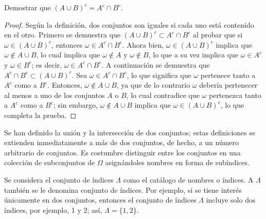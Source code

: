 \documentclass[
  letterpaper,
  DIV=11,
  numbers=noendperiod]{scrreport}
\theoremstyle{plain}
\theoremstyle{definition}
\theoremstyle{definition}
\theoremstyle{plain}
\theoremstyle{remark}
\begin{document}
\begin{tcolorbox}[enhanced jigsaw, titlerule=0mm, left=2mm, opacityback=0, toprule=.15mm, colframe=quarto-callout-caution-color-frame, bottomrule=.15mm, breakable, coltitle=black, opacitybacktitle=0.6, bottomtitle=1mm, colback=white, arc=.35mm, leftrule=.75mm, toptitle=1mm, colbacktitle=quarto-callout-caution-color!10!white, title={Ejemplo}, rightrule=.15mm]

Demostrar que \((A \cup B)^c = A^c \cap B^c\).

\begin{proof}
Según la definición, dos conjuntos son iguales si cada uno está
contenido en el otro. Primero se demuestra que
\((A\cup B)^c \subset A^c\cap B^c\) al probar que si
\(\omega \in (A\cup B)^c\), entonces \(\omega \in A^c \cap B^c\). Ahora
bien, \(\omega \in (A\cup B)^c\) implica que \(\omega \notin A \cup B\),
lo cual implica que \(\omega \notin A\) y \(\omega \notin B\), lo que a
su vez implica que \(\omega \in A^c\) y \(\omega \in B^c\); es decir,
\(\omega \in A^c\cap B^c\). A continuación se demuestra que
\(A^c \cap B^c \subset (A\cup B)^c\). Sea \(\omega \in A^c \cap B^c\),
lo que significa que \(\omega\) pertenece tanto a \(A^c\) como a
\(B^c\). Entonces, \(\omega \notin A \cup B\), ya que de lo contrario
\(\omega\) debería pertenecer al menos a uno de los conjuntos \(A\) o
\(B\), lo cual contradice que \(\omega\) pertenezca tanto a \(A^c\) como
a \(B^c\); sin embargo, \(\omega \notin A \cup B\) implica que
\(\omega \in (A\cup B)^c\), lo que completa la prueba.
\end{proof}

\end{tcolorbox}

Se han definido la unión y la intersección de dos conjuntos; estas
definiciones se extienden inmediatamente a más de dos conjuntos, de
hecho, a un número arbitrario de conjuntos. Es costumbre distinguir
entre los conjuntos en una colección de subconjuntos de \(\Omega\)
asignándoles nombres en forma de subíndices.

Se considera el conjunto de índices \(\Lambda\) como el catálogo de
nombres o índices. A \(\Lambda\) también se le denomina conjunto de
índices. Por ejemplo, si se tiene interés únicamente en dos conjuntos,
entonces el conjunto de índices \(\Lambda\) incluye solo dos índices,
por ejemplo, 1 y 2; así, \(\Lambda=\{1,2\}\).
\end{document}
